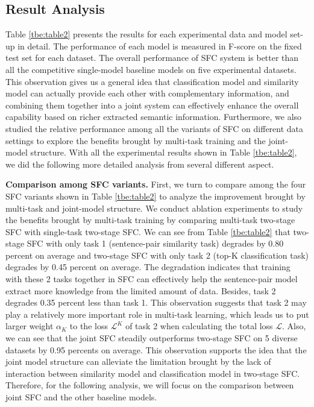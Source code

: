 \documentclass[letterpaper]{article} %
\begin{document}
  \subsection{Result Analysis}

  Table  \ref{tbe:table2}  presents  the  results for each experimental data and
  model  set-up  in detail. The performance of each model is measured in F-score
  on the fixed test set for each dataset. The overall performance of SFC system
  is  better  than  all  the  competitive  single-model  baseline models on five
  experimental   datasets.  This  observation  gives  us  a  general  idea  that
  classification model and similarity model can actually provide each other with
  complementary information, and combining them together into a joint system can
  effectively  enhance the overall capability based on richer extracted semantic
  information.  Furthermore, we also studied  the  relative performance among all the variants of SFC on  different data settings to explore the benefits brought by multi-task training and the joint-model structure.
  With all the experimental results shown in Table \ref{tbe:table2},  we did the following more detailed analysis from several different
  aspect.

  \textbf{Comparison  among  SFC  variants.} First, we turn to compare among the
  four  SFC  variants shown in Table \ref{tbe:table2} to analyze the improvement
  brought  by  multi-task  and  joint-model  structure. We conduct
  ablation  experiments  to study the benefits brought by multi-task training by
  comparing multi-task two-stage SFC with single-task two-stage SFC. We can see from
  Table  \ref{tbe:table2}  that  two-stage  SFC  with  only  task 1 (sentence-pair
  similarity task) degrades by 0.80 percent on average and two-stage SFC with only
  task  2  (top-K  classification  task) degrades by 0.45 percent on average. The
  degradation  indicates  that  training  with these 2 tasks together in SFC can
  effectively  help  the  sentence-pair  model  extract  more knowledge from the
  limited  amount  of data. Besides, task 2 degrades 0.35 percent less than task
  1.  This observation suggests that task 2 may play a relatively more important
  role  in multi-task learning, which leads us to put larger weight $\alpha_{K}$
  to  the  loss  $\mathcal{L}^{K}$  of  task  2  when calculating the total loss
  $\mathcal{L}$.  Also, we can see that the joint SFC steadily outperforms
  two-stage  SFC  on  5  diverse  datasets  by  0.95  percents  on  average.  This
  observation  supports  the idea that the joint model structure can
  alleviate the limitation brought by the lack of interaction between similarity
  model  and  classification  model in two-stage SFC. Therefore, for the following
  analysis,  we  will  focus  on  the comparison between joint SFC and the
  other baseline models.
\end{document}
